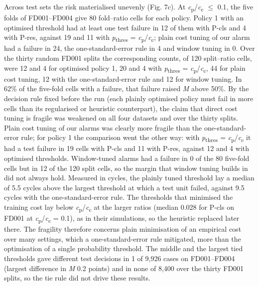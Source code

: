 \documentclass[a4paper,fleqn,doubleblind]{cas-dc}
\begin{document}
Across test sets the risk materialised unevenly (Fig. 7c). At \textit{c}\textsubscript{p}/\textit{c}\textsubscript{c} $\le$ 0.1, the five folds of FD001--FD004 give 80 fold--ratio cells for each policy. Policy 1 with an optimised threshold had at least one test failure in 12 of them with P-cls and 4 with P-res, against 19 and 11 with \textit{p}\textsubscript{thres} = \textit{c}\textsubscript{p}/\textit{c}\textsubscript{c}; plain cost tuning of our alarm had a failure in 24, the one-standard-error rule in 4 and window tuning in 0. Over the thirty random FD001 splits the corresponding counts, of 120 split--ratio cells, were 12 and 4 for optimised policy 1, 20 and 4 with \textit{p}\textsubscript{thres} = \textit{c}\textsubscript{p}/\textit{c}\textsubscript{c}, 44 for plain cost tuning, 12 with the one-standard-error rule and 12 for window tuning. In 62\% of the five-fold cells with a failure, that failure raised \textit{M} above 50\%. By the decision rule fixed before the run (each plainly optimised policy must fail in more cells than its regularised or heuristic counterpart), the claim that direct cost tuning is fragile was weakened on all four datasets and over the thirty splits. Plain cost tuning of our alarms was clearly more fragile than the one-standard-error rule; for policy 1 the comparison went the other way: with \textit{p}\textsubscript{thres} = \textit{c}\textsubscript{p}/\textit{c}\textsubscript{c} it had a test failure in 19 cells with P-cls and 11 with P-res, against 12 and 4 with optimised thresholds. Window-tuned alarms had a failure in 0 of the 80 five-fold cells but in 12 of the 120 split cells, so the margin that window tuning builds in did not always hold. Measured in cycles, the plainly tuned threshold lay a median of 5.5 cycles above the largest threshold at which a test unit failed, against 9.5 cycles with the one-standard-error rule. The thresholds that minimised the training cost lay below \textit{c}\textsubscript{p}/\textit{c}\textsubscript{c} at the larger ratios (median 0.028 for P-cls on FD001 at \textit{c}\textsubscript{p}/\textit{c}\textsubscript{c} = 0.1), as in their simulations, so the heuristic replaced later there. The fragility therefore concerns plain minimisation of an empirical cost over many settings, which a one-standard-error rule mitigated, more than the optimisation of a single probability threshold. The middle and the largest tied thresholds gave different test decisions in 1 of 9,926 cases on FD001--FD004 (largest difference in \textit{M} 0.2 points) and in none of 8,400 over the thirty FD001 splits, so the tie rule did not drive these results.
\end{document}
